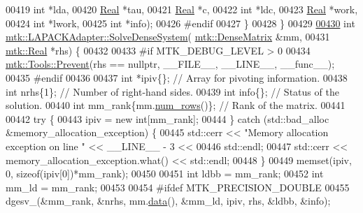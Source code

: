 \begin{DoxyCode}
00419              \textcolor{keywordtype}{int} *lda,
00420              \hyperlink{group__c01-roots_gac080bbbf5cbb5502c9f00405f894857d}{Real} *tau,
00421              \hyperlink{group__c01-roots_gac080bbbf5cbb5502c9f00405f894857d}{Real} *c,
00422              \textcolor{keywordtype}{int} *ldc,
00423              \hyperlink{group__c01-roots_gac080bbbf5cbb5502c9f00405f894857d}{Real} *work,
00424              \textcolor{keywordtype}{int} *lwork,
00425              \textcolor{keywordtype}{int} *info);
00426 \textcolor{preprocessor}{#endif}
00427 \}
00428 \}
00429 
\hypertarget{mtk__lapack__adapter_8cc_source_l00430}{}\hyperlink{classmtk_1_1LAPACKAdapter_a7428bccf74fd4a4af68fb7233846da22}{00430} \textcolor{keywordtype}{int} \hyperlink{classmtk_1_1LAPACKAdapter_a7428bccf74fd4a4af68fb7233846da22}{mtk::LAPACKAdapter::SolveDenseSystem}(
      \hyperlink{classmtk_1_1DenseMatrix}{mtk::DenseMatrix} &mm,
00431                                          \hyperlink{group__c01-roots_gac080bbbf5cbb5502c9f00405f894857d}{mtk::Real} *rhs) \{
00432 
00433 \textcolor{preprocessor}{  #if MTK\_DEBUG\_LEVEL > 0}
00434   \hyperlink{classmtk_1_1Tools_a332324c6f25e66be9dff48c5987a3b9f}{mtk::Tools::Prevent}(rhs == \textcolor{keyword}{nullptr}, \_\_FILE\_\_, \_\_LINE\_\_, \_\_func\_\_);
00435 \textcolor{preprocessor}{  #endif}
00436 
00437   \textcolor{keywordtype}{int} *ipiv\{\};                \textcolor{comment}{// Array for pivoting information.}
00438   \textcolor{keywordtype}{int} nrhs\{1\};                \textcolor{comment}{// Number of right-hand sides.}
00439   \textcolor{keywordtype}{int} info\{\};                 \textcolor{comment}{// Status of the solution.}
00440   \textcolor{keywordtype}{int} mm\_rank\{mm.\hyperlink{classmtk_1_1DenseMatrix_a53f3afb3b6a8d21854458aaa9663cc74}{num\_rows}()\}; \textcolor{comment}{// Rank of the matrix.}
00441 
00442   \textcolor{keywordflow}{try} \{
00443     ipiv = \textcolor{keyword}{new} \textcolor{keywordtype}{int}[mm\_rank];
00444   \} \textcolor{keywordflow}{catch} (std::bad\_alloc &memory\_allocation\_exception) \{
00445     std::cerr << \textcolor{stringliteral}{"Memory allocation exception on line "} << \_\_LINE\_\_ - 3 <<
00446       std::endl;
00447     std::cerr << memory\_allocation\_exception.what() << std::endl;
00448   \}
00449   memset(ipiv, 0, \textcolor{keyword}{sizeof}(ipiv[0])*mm\_rank);
00450 
00451   \textcolor{keywordtype}{int} ldbb = mm\_rank;
00452   \textcolor{keywordtype}{int} mm\_ld = mm\_rank;
00453 
00454 \textcolor{preprocessor}{  #ifdef MTK\_PRECISION\_DOUBLE}
00455   dgesv\_(&mm\_rank, &nrhs, mm.\hyperlink{classmtk_1_1DenseMatrix_a0c33b8a9e01d157c61ddbdf807c25d84}{data}(), &mm\_ld, ipiv, rhs, &ldbb, &info);

\end{DoxyCode}
